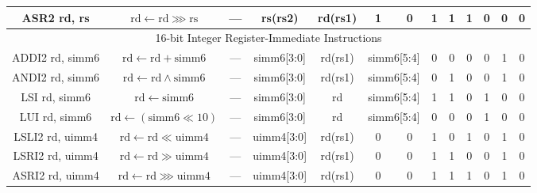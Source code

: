 \documentclass[a4paper,10pt]{article}
\begin{document}
\begin{landscape}
\begin{longtable}[c]{|c|c|@{}c@{}|@{}c@{}|@{}c@{}|@{}c@{}|@{}c@{}|@{}c@{}|@{}c@{}|@{}c@{}|@{}c@{}|@{}c@{}|@{}c@{}|@{}c@{}|@{}c@{}|@{}c@{}|@{}c@{}|@{}c@{}|@{}c@{}|@{}c@{}|@{}c@{}|@{}c@{}|@{}c@{}|@{}c@{}|@{}c@{}|@{}c@{}|}
ASR2 rd, rs           & $\mathrm{rd} \leftarrow \mathrm{rd} \ggg \mathrm{rs}$ & \multicolumn{8}{c|}{---}                                   & \multicolumn{4}{c|}{rs(rs2)}        & \multicolumn{4}{c|}{rd(rs1)} & 1                & 0                & 1   & 1   & 1   & 0 & 0 & 0 \\

\hline
\multicolumn{26}{|c|}{16-bit Integer Register-Immediate Instructions}                                                                                                                                                                                                                                                             \\\hline
ADDI2 rd, simm6       & $\mathrm{rd} \leftarrow \mathrm{rd} + \mathrm{simm6}$ & \multicolumn{8}{c|}{---}                                   & \multicolumn{4}{c|}{simm6{[}3:0{]}} & \multicolumn{4}{c|}{rd(rs1)} & \multicolumn{2}{c|}{simm6{[}5:4{]}}  & 0   & 0   & 0   & 0 & 1 & 0 \\
ANDI2 rd, simm6       & $\mathrm{rd} \leftarrow \mathrm{rd} \land \mathrm{simm6}$ & \multicolumn{8}{c|}{---}                                   & \multicolumn{4}{c|}{simm6{[}3:0{]}} & \multicolumn{4}{c|}{rd(rs1)} & \multicolumn{2}{c|}{simm6{[}5:4{]}}  & 0   & 1   & 0   & 0 & 1 & 0 \\
LSI rd, simm6         & $\mathrm{rd} \leftarrow \mathrm{simm6}$ & \multicolumn{8}{c|}{---}                                   & \multicolumn{4}{c|}{simm6{[}3:0{]}} & \multicolumn{4}{c|}{rd}      & \multicolumn{2}{c|}{simm6{[}5:4{]}}  & 1   & 1   & 0   & 1 & 0 & 0 \\
LUI rd, simm6         & $\mathrm{rd} \leftarrow (\mathrm{simm6} \ll 10)$ & \multicolumn{8}{c|}{---}                                   & \multicolumn{4}{c|}{simm6{[}3:0{]}} & \multicolumn{4}{c|}{rd}      & \multicolumn{2}{c|}{simm6{[}5:4{]}}  & 0   & 0   & 0   & 1 & 0 & 0 \\
LSLI2 rd, uimm4       & $\mathrm{rd} \leftarrow \mathrm{rd} \ll \mathrm{uimm4}$ & \multicolumn{8}{c|}{---}                                   & \multicolumn{4}{c|}{uimm4{[}3:0{]}} & \multicolumn{4}{c|}{rd(rs1)} & 0              & 0              & 1   & 0   & 1   & 0 & 1 & 0 \\
LSRI2 rd, uimm4       & $\mathrm{rd} \leftarrow \mathrm{rd} \gg \mathrm{uimm4}$ & \multicolumn{8}{c|}{---}                                   & \multicolumn{4}{c|}{uimm4{[}3:0{]}} & \multicolumn{4}{c|}{rd(rs1)} & 0              & 0              & 1   & 1   & 0   & 0 & 1 & 0 \\
ASRI2 rd, uimm4       & $\mathrm{rd} \leftarrow \mathrm{rd} \ggg \mathrm{uimm4}$ & \multicolumn{8}{c|}{---}                                   & \multicolumn{4}{c|}{uimm4{[}3:0{]}} & \multicolumn{4}{c|}{rd(rs1)} & 0              & 0              & 1   & 1   & 1   & 0 & 1 & 0 \\


\end{longtable}
\end{landscape}
\end{document}
